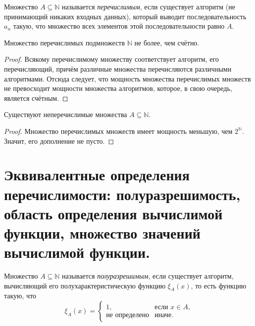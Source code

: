 \documentclass{article}
\begin{document}
    \begin{definition}
        Множество \(A \subseteq \mathbb{N}\) называется \textit{перечислимым}, если существует
        алгоритм (не принимающий никаких входных данных), который выводит последовательность \(a_n\)
        такую, что множество всех элементов этой последовательности равно \(A\).
    \end{definition}

    \begin{statement}
        Множество перечислимых подмножеств \(\mathbb{N}\) не более, чем счётно.
    \end{statement}
    \begin{proof}
        Всякому перечислимому множеству соответствует алгоритм, его перечисляющий, причём различные множества
        перечисляются различными алгоритмами. Отсюда следует, что мощность множества перечислимых множеств не
        превосходит мощности множества алгоритмов, которое, в свою очередь, является счётным.
    \end{proof}

    \begin{theorem}
        Существуют неперечислимые множества \(A \subseteq \mathbb{N}\).
    \end{theorem}
    \begin{proof}
        Множество перечислимых множеств имеет мощность меньшую, чем \(2^\mathbb{N}\). Значит, его дополнение
        не пусто.
    \end{proof}

    \section{Эквивалентные определения перечислимости: полуразрешимость, область определения
    вычислимой функции, множество значений вычислимой функции.}

    \begin{definition}
        Множество \(A \subseteq \mathbb{N}\) называется \textit{полуразрешимым}, если существует алгоритм,
        вычисляющий его полухарактеристическую функцию \(\xi_A(x)\), то есть функцию такую, что
        $$
            \xi_A(x) =
            \begin{cases}
                1, & \text{если \(x \in A\),}\\
                \text{не определено} & \text{иначе.}
            \end{cases}
        $$
    \end{definition}
\end{document}
